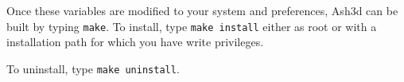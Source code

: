 Once these variables are modified to your system and preferences, Ash3d can
be built by typing \texttt{make}.  To install, type \texttt{make install}
either as root or with a installation path for which you have write
privileges.

To uninstall, type \texttt{make uninstall}.
